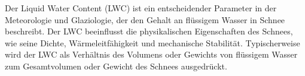 Der Liquid Water Content (LWC) ist ein entscheidender Parameter in der Meteorologie und Glaziologie, der den Gehalt an flüssigem Wasser in Schnee beschreibt. Der LWC beeinflusst die physikalischen Eigenschaften des Schnees, wie seine Dichte, Wärmeleitfähigkeit und mechanische Stabilität. Typischerweise wird der LWC als Verhältnis des Volumens oder Gewichts von flüssigem Wasser zum Gesamtvolumen oder Gewicht des Schnees ausgedrückt.

